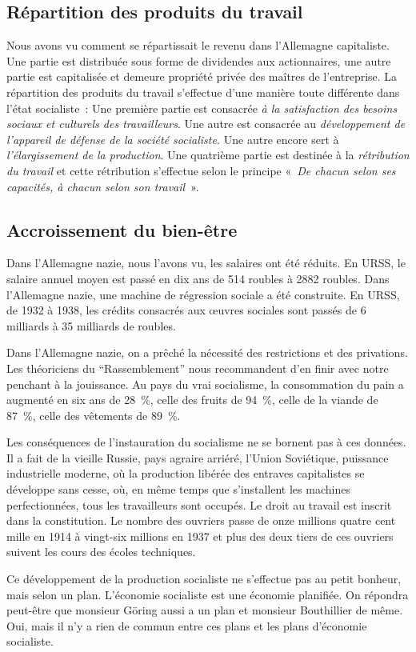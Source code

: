 \documentclass[french,twoside]{book} %
\begin{document}
\subsection[Répartition des produits du travail]{Répartition des produits du travail}
\noindent Nous avons vu comment se répartissait le revenu dans l’Allemagne capitaliste. Une partie est distribuée sous forme de dividendes aux actionnaires, une autre partie est capitalisée et demeure propriété privée des maîtres de l’entreprise. La répartition des produits du travail s’effectue d’une manière toute différente dans l’état socialiste : Une première partie est consacrée \emph{à la satisfaction des besoins sociaux et culturels des travailleurs}. Une autre est consacrée au \emph{développement de l’appareil de défense de la société socialiste.} Une autre encore sert à \emph{l’élargissement de la production}. Une quatrième partie est destinée à la \emph{rétribution du travail} et cette rétribution s’effectue selon le principe « \emph{De chacun selon ses capacités, à chacun selon son travail} ».
\subsection[Accroissement du bien-être]{Accroissement du bien-être}
\noindent Dans l’Allemagne nazie, nous l’avons vu, les salaires ont été réduits. En URSS, le salaire annuel moyen est passé en dix ans de 514 roubles à 2882 roubles. Dans l’Allemagne nazie, une machine de régression sociale a été construite. En URSS, de 1932 à 1938, les crédits consacrés aux œuvres sociales sont passés de 6 milliards à 35 milliards de roubles.\par
Dans l’Allemagne nazie, on a prêché la nécessité des restrictions et des privations. Les théoriciens du “Rassemblement” nous recommandent d’en finir avec notre penchant à la jouissance. Au pays du vrai socialisme, la consommation du pain a augmenté en six ans de 28 \%, celle des fruits de 94 \%, celle de la viande de 87 \%, celle des vêtements de 89 \%.\par
Les conséquences de l’instauration du socialisme ne se bornent pas à ces données. Il a fait de la vieille Russie, pays agraire arriéré, l’Union Soviétique, puissance industrielle moderne, où la production libérée des entraves capitalistes se développe sans cesse, où, en même temps que s’installent les machines perfectionnées, tous les travailleurs sont occupés. Le droit au travail est inscrit dans la constitution. Le nombre des ouvriers passe de onze millions quatre cent mille en 1914 à vingt-six millions en 1937 et plus des deux tiers de ces ouvriers suivent les cours des écoles techniques.\par
Ce développement de la production socialiste ne s’effectue pas au petit bonheur, mais selon un plan. L’économie socialiste est une économie planifiée. On répondra peut-être que monsieur Göring aussi a un plan et monsieur Bouthillier de même. Oui, mais il n’y a rien de commun entre ces plans et les plans d’économie socialiste.
\end{document}
